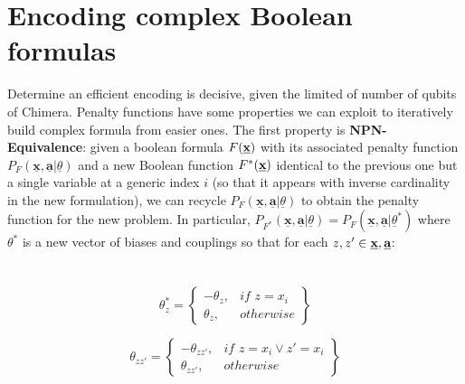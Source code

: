 \section{Encoding complex Boolean formulas}

Determine an efficient encoding is decisive, given the limited of number of qubits of Chimera. Penalty functions have some properties we can exploit to iteratively build complex formula from easier ones. The first property is \textbf{NPN-Equivalence}: given a boolean formula $F(\textbf{\underline{x}})$ with its associated penalty function $P_F(\underline{\textbf{x}},\underline{\textbf{a}} | \underline{\theta})$ and a new Boolean function $F^*(\textbf{\underline{x}})$ identical to the previous one but a single variable at a generic index $i$ (so that it appears with inverse cardinality in the new formulation), we can recycle $P_F(\underline{\textbf{x}},\underline{\textbf{a}} | \underline{\theta})$ to obtain the penalty function for the new problem. In particular, $P_{F^*}(\underline{\textbf{x}},\underline{\textbf{a}} | \underline{\theta}) = P_F(\underline{\textbf{x}},\underline{\textbf{a}} | \underline{\theta}^*)$ where $\theta^*$ is a new vector of biases and couplings so that for each $z,z'\in \textbf{\underline{x}},\textbf{\underline{a}}$: \\ \\ \\

\begin{equation}
    \theta_z^* = 
    \left\{
        \begin{array}{lr}
            -\theta_z, & \textit{if }z = x_i \\
            \theta_z, & otherwise
        \end{array}
    \right\}
\end{equation}

\begin{equation}
    \theta_{zz'} = 
    \left\{
        \begin{array}{lr}
            -\theta_{zz'}, & \textit{if }z = x_i \vee z' = x_i\\
            \theta_{zz'}, & otherwise
        \end{array}
    \right\}
\end{equation}


